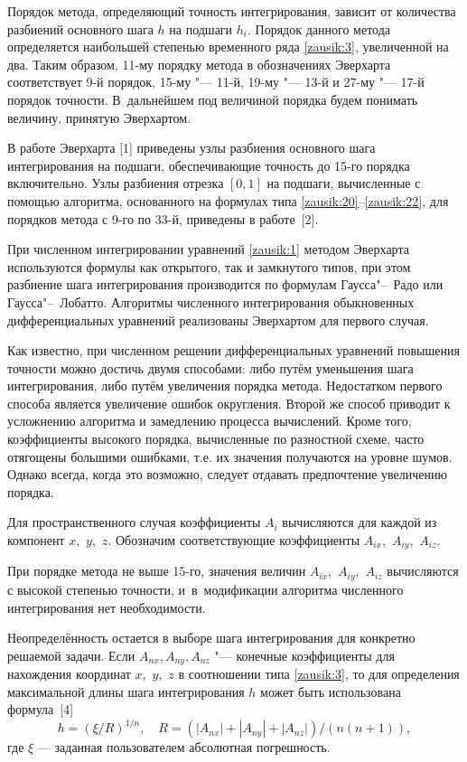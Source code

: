 Порядок метода, определяющий точность интегрирования, зависит от количества разбиений основного шага $h$ на подшаги $h_i$. Порядок данного метода определяется наибольшей степенью временного ряда \eqref{zausik:3}, увеличенной на два. 
Таким образом, 11-му порядку метода в обозначениях  Эверхарта соответствует 9-й порядок, 15-му "--- 11-й, 19-му "--- 13-й и 27-му "--- 17-й порядок точности. В~дальнейшем под величиной порядка будем понимать величину, принятую  Эверхартом.

В работе  Эверхарта [1] приведены узлы разбиения основного шага интегрирования на подшаги, обеспечивающие точность до 15-го  порядка включительно. Узлы разбиения отрезка $[0,1]$ на подшаги, вычисленные с помощью алгоритма, основанного на формулах типа \eqref{zausik:20}--\eqref{zausik:22}, для порядков метода с 9-го по 33-й, приведены в работе~[2].

При численном интегрировании уравнений \eqref{zausik:1} методом  Эверхарта используются формулы как открытого, так и замкнутого типов, при этом разбиение шага интегрирования производится по формулам Гаусса"--~Радо или Гаусса"--~Лобатто.  
Алгоритмы численного интегрирования обыкновенных дифференциальных уравнений реализованы  Эверхартом для первого случая.

Как известно, при численном решении дифференциальных уравнений повышения точности можно достичь двумя способами: либо путём уменьшения шага интегрирования, либо путём увеличения порядка метода. 
Недостатком первого способа является увеличение ошибок округления. 
Второй же способ приводит к усложнению алгоритма и замедлению  процесса вычислений. Кроме того, коэффициенты высокого порядка, вычисленные по разностной схеме, часто отягощены большими ошибками, т.е. их значения получаются на уровне шумов. Однако всегда, когда это возможно, следует отдавать предпочтение увеличению порядка.

\smallskip

Для пространственного случая коэффициенты $A_i$ вычисляются для каждой из компонент $x,$ $y,$ $z$. Обозначим соответствующие коэффициенты  $A_{ix},$ $ A_{iy},$ $A_{iz}$.

При порядке метода не выше 15-го, значения величин  $A_{ix},$ $A_{iy},$ $A_{iz}$ вычисляются с высокой степенью точности, и~в~модификации алгоритма численного интегрирования нет необходимости.

Неопределённость остается в выборе шага интегрирования для конкретно решаемой задачи. Если $A_{nx}, A_{ny}, A_{nz}$ "--- конечные коэффициенты для нахождения координат $x,$ $y,$ $z$ в соотношении типа \eqref{zausik:3}, то для определения максимальной длины шага интегрирования $h$ может быть использована формула~[4]
\begin{equation}
h=(\xi/R)^{1/n}, \quad R=(|A_{nx}|+|A_{ny}|+|A_{nz}|)/(n (n+1)),
\label{zausik:24}
\end{equation}
где $\xi$ --- заданная пользователем абсолютная погрешность.

